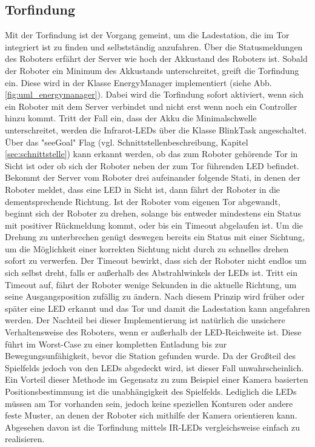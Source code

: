 \subsection{Torfindung}
\label{sec:torfindung}
Mit der Torfindung ist der Vorgang gemeint, um die Ladestation, die im Tor integriert ist zu finden und selbstständig anzufahren. Über die Statusmeldungen des Roboters erfährt der Server wie hoch der Akkustand des Roboters ist. Sobald der Roboter ein Minimum des Akkustands unterschreitet, greift die Torfindung ein. Diese wird in der Klasse EnergyManager implementiert (siehe Abb. \ref{fig:uml_energymanager}). Dabei wird die Torfindung sofort aktiviert, wenn sich ein Roboter mit dem Server verbindet und nicht erst wenn noch ein Controller hinzu kommt. Tritt der Fall ein, dass der Akku die Minimalschwelle unterschreitet, werden die Infrarot-LEDs über die Klasse BlinkTask angeschaltet. Über das "seeGoal" Flag (vgl. Schnittstellenbeschreibung, Kapitel \ref{sec:schnittstelle}) kann erkannt werden, ob das zum Roboter gehörende Tor in Sicht ist oder ob sich der Roboter neben der zum Tor führenden LED befindet. Bekommt der Server vom Roboter drei aufeinander folgende Stati, in denen der Roboter meldet, dass eine LED in Sicht ist, dann fährt der Roboter in die dementsprechende Richtung. Ist der Roboter vom eigenen Tor abgewandt, beginnt sich der Roboter zu drehen, solange bis entweder mindestens ein Status mit positiver Rückmeldung kommt, oder bis ein Timeout abgelaufen ist. Um die Drehung zu unterbrechen genügt deswegen bereits ein Status mit einer Sichtung, um die Möglichkeit einer korrekten Sichtung nicht durch zu schnelles drehen sofort zu verwerfen. Der Timeout bewirkt, dass sich der Roboter nicht endlos um sich selbst dreht, falls er außerhalb des Abstrahlwinkels der LEDs ist. Tritt ein Timeout auf, fährt der Roboter wenige Sekunden in die aktuelle Richtung, um seine Ausgangsposition zufällig zu ändern. Nach diesem Prinzip wird früher oder später eine LED erkannt und das Tor und damit die Ladestation kann angefahren werden. 
Der Nachteil bei dieser Implementierung ist natürlich die unsichere Verhaltensweise des Roboters, wenn er außerhalb der LED-Reichweite ist. Diese führt im Worst-Case zu einer kompletten Entladung bis zur Bewegungsunfähigkeit, bevor die Station gefunden wurde. Da der Großteil des Spielfelds jedoch von den LEDs abgedeckt wird, ist dieser Fall unwahrscheinlich. Ein Vorteil dieser Methode im Gegensatz zu zum Beispiel einer Kamera basierten Positionsbestimmung ist die unabhängigkeit des Spielfelds. Lediglich die LEDs müssen am Tor vorhanden sein, jedoch keine speziellen Konturen oder andere feste Muster, an denen der Roboter sich mithilfe der Kamera orientieren kann. Abgesehen davon ist die Torfindung mittels IR-LEDs vergleichsweise einfach zu realisieren.

